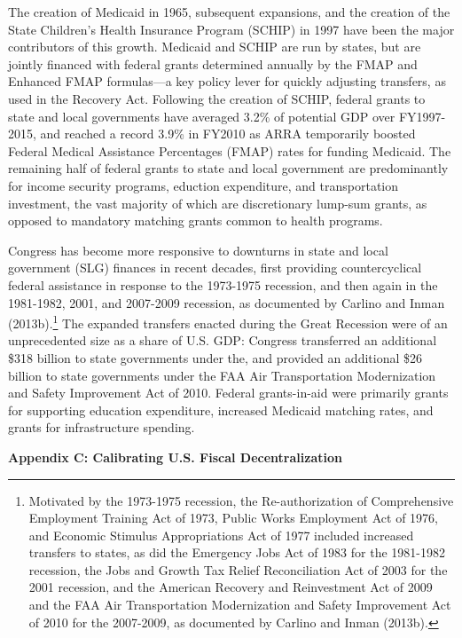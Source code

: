 \documentclass[12pt,letterpaper]{article}
\begin{document}
The creation of Medicaid in 1965, subsequent expansions, and the creation of the State Children's Health Insurance Program (SCHIP) in 1997 have been the major contributors of this growth. Medicaid and SCHIP are run by states, but are jointly financed with federal grants determined annually by the FMAP and Enhanced FMAP formulas---a key policy lever for quickly adjusting transfers, as used in the Recovery Act. Following the creation of SCHIP, federal grants to state and local governments have averaged 3.2\% of potential GDP over FY1997-2015, and reached a record 3.9\% in FY2010 as ARRA temporarily boosted Federal Medical Assistance Percentages (FMAP) rates for funding Medicaid. The remaining half of federal grants to state and local government are predominantly for income security programs, eduction expenditure, and transportation investment, the vast majority of which are discretionary lump-sum grants, as opposed to mandatory matching grants common to health programs. 

Congress has become more responsive to downturns in state and local government (SLG)  finances in recent decades, first providing countercyclical federal assistance in response to the 1973-1975 recession, and then again in the 1981-1982, 2001, and 2007-2009 recession, as documented by Carlino and Inman (2013b).\footnote{Motivated by the 1973-1975 recession, the Re-authorization of Comprehensive Employment Training Act of 1973, Public Works Employment Act of 1976, and Economic Stimulus Appropriations Act of 1977 included increased transfers to states, as did the Emergency Jobs Act of 1983 for the 1981-1982 recession, the Jobs and Growth Tax Relief Reconciliation Act of 2003 for the 2001 recession, and the American Recovery and Reinvestment Act of 2009 and the FAA Air Transportation Modernization and Safety Improvement Act of 2010 for the 2007-2009, as documented by Carlino and Inman (2013b).}  The expanded transfers enacted during the Great Recession were of an unprecedented size as a share of U.S. GDP: Congress transferred an additional \$318 billion to state governments under the, and provided an additional \$26 billion to state governments under the FAA Air Transportation Modernization and Safety Improvement Act of 2010. Federal grants-in-aid were primarily grants for supporting education expenditure, increased Medicaid matching rates, and grants for infrastructure spending.

\pagebreak

\begin{center}
\textbf{Appendix C: Calibrating U.S. Fiscal Decentralization}
\end{center}
\end{document}
